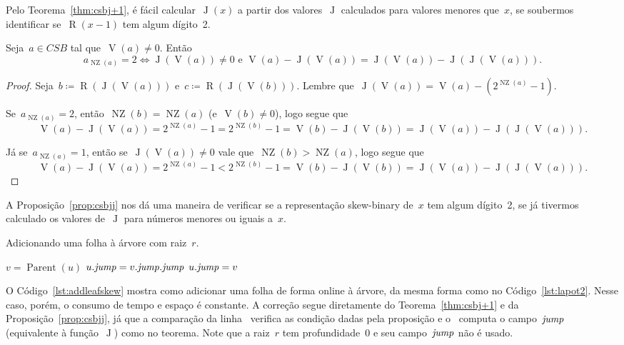 \documentclass[main.tex]{subfiles}
\newcommand{\Par}{\operatorname{Parent}}
\newcommand{\Dep}{\operatorname{D}}
\newcommand{\NZ}{\operatorname{NZ}}
\newcommand{\CSB}{\textit{CSB}}
\renewcommand{\V}{\operatorname{V}}
\newcommand{\R}{\operatorname{R}}
\newcommand{\J}{\operatorname{J}}
\begin{document}
Pelo Teorema~\ref{thm:csbj+1}, é fácil calcular~$\J(x)$ a partir dos valores~$\J$ calculados para valores menores que~$x$, se soubermos identificar se~$\R(x - 1)$ tem algum dígito~2.

\begin{proposition} \label{prop:csbjj}
	Seja~$a \in \CSB$ tal que~$\V(a) \neq 0$. Então \vspace{-2ex}
	$${a_{\NZ(a)} = 2 \iff \J(\V(a)) \neq 0 \text{ e } \V(a) - \J(\V(a)) = \J(\V(a)) - \J(\J(\V(a))).}$$
\end{proposition}
\begin{proof}
	Seja~$b \coloneqq \R(\J(\V(a)))$ e~${c \coloneqq \R(\J(\V(b)))}$. Lembre que~${\J(\V(a)) = \V(a) - (2^{\NZ(a)} - 1)}$.

	Se~$a_{\NZ(a)} = 2$, então~$\NZ(b) = \NZ(a)$ (e~$\V(b) \neq 0$), logo segue que~$$\V(a) - \J(\V(a)) = 2^{\NZ(a)} - 1 = 2^{\NZ(b)} - 1 = \V(b) - \J(\V(b)) = \J(\V(a)) - \J(\J(\V(a))).$$

	Já se~$a_{\NZ(a)} = 1$, então se~$\J(\V(a)) \neq 0$ vale que~$\NZ(b) > \NZ(a)$, logo segue que~$$\V(a) - \J(\V(a)) = 2^{\NZ(a)} - 1 < 2^{\NZ(b)} - 1 = \V(b) - \J(\V(b)) = \J(\V(a)) - \J(\J(\V(a))).$$
\end{proof}

A Proposição~\ref{prop:csbjj} nos dá uma maneira de verificar se a representação skew-binary de~$x$ tem algum dígito~2, se já tivermos calculado os valores de~$\J$ para números menores ou iguais a~$x$.

\renewcommand{\root}{\mathit{root}}
\begin{algorithm}
\caption{Adicionando uma folha à árvore com raiz~$r$.} \label{lst:addleafskew}
\begin{algorithmic}[1]
		\State $v = \Par(u)$
		\If{$v.\jmp \neq r \textbf{ and } \Dep(v) - \Dep(v.\jmp) = \Dep(v.\jmp) - \Dep(v.\jmp.\jmp)$} \label{lst:addleafskew:if}
			\State $u.\mathit{jump} = v.\mathit{jump}.\mathit{jump}$
		\Else
			\State $u.\mathit{jump} = v$
		\EndIf
	\EndFunction
\end{algorithmic}
\end{algorithm}

O Código~\ref{lst:addleafskew} mostra como adicionar uma folha de forma online à árvore, da mesma forma como no Código~\ref{lst:lapot2}. Nesse caso, porém, o consumo de tempo e espaço é constante. A correção segue diretamente do Teorema~\ref{thm:csbj+1} e da Proposição~\ref{prop:csbjj}, já que a comparação da linha~ verifica as condição dadas pela proposição e o~ computa o campo~$\mathit{jump}$ (equivalente à função~$\J$) como no teorema. Note que a raiz~$r$ tem profundidade~0 e seu campo~$\mathit{jump}$ não é usado.
\end{document}
